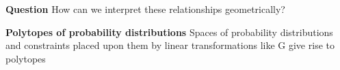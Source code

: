 \begin{frame}
\begin{block}{\textbf{Question}}
How can we interpret these relationships geometrically?
\end{block}
\begin{block}{\textbf{Polytopes of probability distributions}}
Spaces of probability distributions and constraints placed upon them by linear transformations like G give rise to polytopes
\end{block}
\end{frame}

